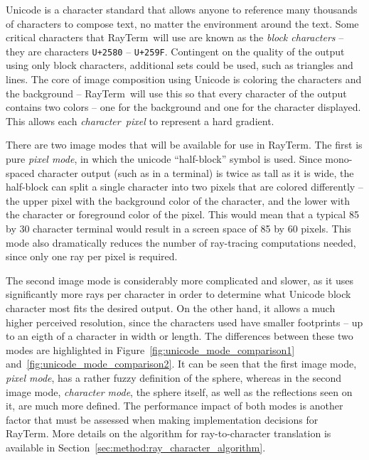 \documentclass[11pt]{article}
\newcommand{\name}{{\sc RayTerm}}
\begin{document}
Unicode is a character standard that allows anyone to reference many thousands of characters to compose text, no matter the environment around the text.
Some critical characters that \name\ will use are known as the {\it block characters} -- they are characters \texttt{U+2580} -- \texttt{U+259F}.
Contingent on the quality of the output using only block characters, additional sets could be used, such as triangles and lines.
The core of image composition using Unicode is coloring the characters and the background -- \name\ will use this so that every character of the output contains two colors -- one for the background and one for the character displayed.
This allows each {\it character~pixel} to represent a hard gradient.

There are two image modes that will be available for use in \name.
The first is pure {\it pixel mode}, in which the unicode ``half-block'' symbol is used.
Since mono-spaced character output (such as in a terminal) is twice as tall as it is wide, the half-block can split a single character into two pixels that are colored differently -- the upper pixel with the background color of the character, and the lower with the character or foreground color of the pixel.
This would mean that a typical 85 by 30 character terminal would result in a screen space of 85 by 60 pixels.
This mode also dramatically reduces the number of ray-tracing computations needed, since only one ray per pixel is required.

The second image mode is considerably more complicated and slower, as it uses significantly more rays per character in order to determine what Unicode block character most fits the desired output.
On the other hand, it allows a much higher perceived resolution, since the characters used have smaller footprints -- up to an eigth of a character in width or length.
The differences between these two modes are highlighted in Figure~\ref{fig:unicode_mode_comparison1} and~\ref{fig:unicode_mode_comparison2}.
It can be seen that the first image mode, {\it pixel mode}, has a rather fuzzy definition of the sphere, whereas in the second image mode, {\it character mode}, the sphere itself, as well as the reflections seen on it, are much more defined.
The performance impact of both modes is another factor that must be assessed when making implementation decisions for \name.
More details on the algorithm for ray-to-character translation is available in Section~\ref{sec:method:ray_character_algorithm}.
\end{document}
